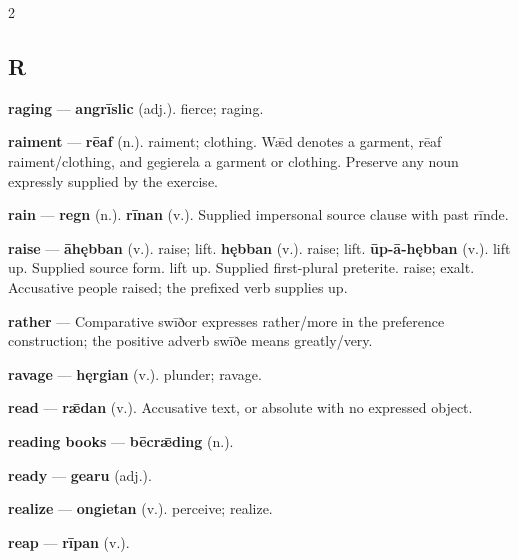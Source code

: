 \begin{multicols}{2}
\subsection*{R}
\textbf{raging} — \textbf{angrīslic} (adj.). fierce; raging.\par
\textbf{raiment} — \textbf{rēaf} (n.). raiment; clothing. Wǣd denotes a garment, rēaf raiment/clothing, and gegierela a garment or clothing. Preserve any noun expressly supplied by the exercise.\par
\textbf{rain} — \textbf{regn} (n.).  \textbf{rīnan} (v.). Supplied impersonal source clause with past rīnde.\par
\textbf{raise} — \textbf{āhębban} (v.). raise; lift. \textbf{hębban} (v.). raise; lift. \textbf{ūp-ā-hębban} (v.). lift up. Supplied source form. lift up. Supplied first-plural preterite. raise; exalt. Accusative people raised; the prefixed verb supplies up.\par
\textbf{rather} — Comparative swīðor expresses rather/more in the preference construction; the positive adverb swīðe means greatly/very.\par
\textbf{ravage} — \textbf{hęrgian} (v.). plunder; ravage.\par
\textbf{read} — \textbf{rǣdan} (v.). Accusative text, or absolute with no expressed object.\par
\textbf{reading books} — \textbf{bēcrǣding} (n.).\par
\textbf{ready} — \textbf{gearu} (adj.).\par
\textbf{realize} — \textbf{ongietan} (v.). perceive; realize.\par
\textbf{reap} — \textbf{rīpan} (v.).\par

\end{multicols}
